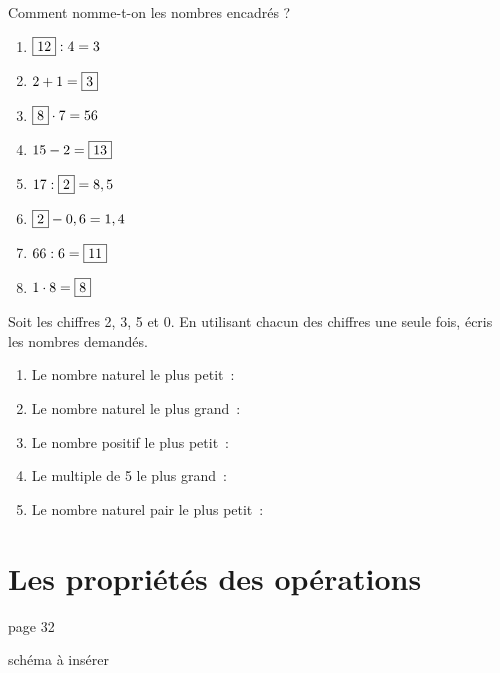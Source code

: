 \documentclass[syllabus_1.tex]{subfiles}
\begin{document}
\begin{exercise}
    Comment nomme-t-on les nombres encadrés ?
    \begin{enumerate}[cols=2]
        \item \(\fbox{12} :4 = 3\) \dotfill
        \item \(2 + 1 = \fbox{3}\) \dotfill
        \item \(\fbox{8} \cdot 7 = 56\) \dotfill
        \item \(15 - 2 = \fbox{13}\) \dotfill
        \item \(17 :\fbox{2} = 8,5\) \dotfill
        \item \(\fbox{2} - 0,6 = 1,4\) \dotfill
        \item \(66 :6 = \fbox{11}\) \dotfill
        \item \(1  \cdot  8 = \fbox{8}\) \dotfill
    \end{enumerate}
\end{exercise}

\begin{exercise}
    Soit les chiffres 2, 3, 5 et 0. En utilisant chacun des chiffres une seule fois, écris les nombres demandés.
\end{exercise}

\begin{enumerate}[itemsep=1em]
    \item Le nombre naturel le plus petit~:
    \item Le nombre naturel le plus grand~:
    \item Le nombre positif le plus petit~:
    \item Le multiple de 5 le plus grand~:
    \item Le nombre naturel pair le plus petit~:
\end{enumerate}

\newpage

\section{Les propriétés des opérations}

 page 32

schéma à insérer
\end{document}

